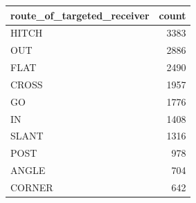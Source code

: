 \begin{tabular}{lr}
\toprule
route\_of\_targeted\_receiver & count \\
\midrule
HITCH & 3383 \\
OUT & 2886 \\
FLAT & 2490 \\
CROSS & 1957 \\
GO & 1776 \\
IN & 1408 \\
SLANT & 1316 \\
POST & 978 \\
ANGLE & 704 \\
CORNER & 642 \\
\bottomrule
\end{tabular}
